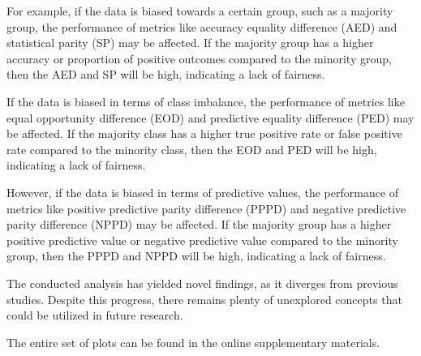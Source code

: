 \documentclass[sn-vancouver]{sn-jnl}%
\theoremstyle{thmstyleone}%
\theoremstyle{thmstyletwo}%
\theoremstyle{thmstylethree}%
\begin{document}
For example, if the data is biased towards a certain group, such as a majority group, the performance of metrics like accuracy equality difference (AED) and statistical parity (SP) may be affected. If the majority group has a higher accuracy or proportion of positive outcomes compared to the minority group, then the AED and SP will be high, indicating a lack of fairness.

If the data is biased in terms of class imbalance, the performance of metrics like equal opportunity difference (EOD) and predictive equality difference (PED) may be affected. If the majority class has a higher true positive rate or false positive rate compared to the minority class, then the EOD and PED will be high, indicating a lack of fairness.

However, if the data is biased in terms of predictive values, the performance of metrics like positive predictive parity difference (PPPD) and negative predictive parity difference (NPPD) may be affected. If the majority group has a higher positive predictive value or negative predictive value compared to the minority group, then the PPPD and NPPD will be high, indicating a lack of fairness.

The conducted analysis has yielded novel findings, as it diverges from previous studies. Despite this progress, there remains plenty of unexplored concepts that could be utilized in future research.

\backmatter


The entire set of plots can be found in the online supplementary materials.
\end{document}
